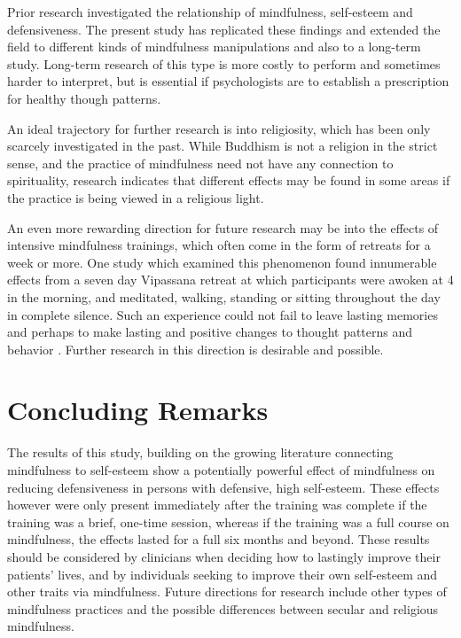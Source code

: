 \documentclass[jou]{apa}
\begin{document}
Prior research \cite{lakey2007} investigated the relationship of mindfulness, self-esteem and defensiveness.  The present study has replicated these findings and extended the field to different kinds of mindfulness manipulations and also to a long-term study.  Long-term research of this type is more costly to perform and sometimes harder to interpret, but is essential if psychologists are to establish a prescription for healthy though patterns.  

An ideal trajectory for further research is into religiosity, which has been only scarcely investigated in the past.  While Buddhism is not a religion in the strict sense, and the practice of mindfulness need not have any connection to spirituality, research indicates that different effects may be found in some areas if the practice is being viewed in a religious light.  

An even more rewarding direction for future research may be into the effects of intensive mindfulness trainings, which often come in the form of retreats for a week or more.  One study which examined this phenomenon found innumerable effects from a seven day Vipassana retreat at which participants were awoken at 4 in the morning, and meditated, walking, standing or sitting throughout the day in complete silence.  Such an experience could not fail to leave lasting memories and perhaps to make lasting and positive changes to thought patterns and behavior \cite{Emavardhana1997}.  Further research in this direction is desirable and possible.  

\section{Concluding Remarks}

The results of this study, building on the growing literature connecting mindfulness to self-esteem show a potentially powerful effect of mindfulness on reducing defensiveness in persons with defensive, high self-esteem.  These effects however were only present immediately after the training was complete if the training was a brief, one-time session, whereas if the training was a full course on mindfulness, the effects lasted for a full six months and beyond.  These results should be considered by clinicians when deciding how to lastingly improve their patients' lives, and by individuals seeking to improve their own self-esteem and other traits via mindfulness.  Future directions for research include other types of mindfulness practices and the possible differences between secular and religious mindfulness.  
                                                                                                                                                

     
\end{document}
